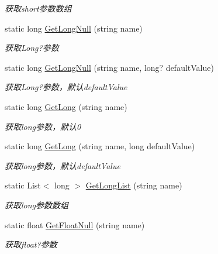 \begin{DoxyCompactItemize}
\begin{DoxyCompactList}\small\item\em 获取short参数数组 \end{DoxyCompactList}\item 
static long \hyperlink{class_x_c_l_net_tools_1_1_string_hander_1_1_form_helper_abffef0560d4655c00c5bdd3e4ff087cc}{Get\+Long\+Null} (string name)
\begin{DoxyCompactList}\small\item\em 获取\+Long?参数 \end{DoxyCompactList}\item 
static long \hyperlink{class_x_c_l_net_tools_1_1_string_hander_1_1_form_helper_a68e18e28dc369539e7efca42fc887041}{Get\+Long\+Null} (string name, long? default\+Value)
\begin{DoxyCompactList}\small\item\em 获取\+Long?参数，默认default\+Value \end{DoxyCompactList}\item 
static long \hyperlink{class_x_c_l_net_tools_1_1_string_hander_1_1_form_helper_a55353bd867fa827c8eb55a710df02cb1}{Get\+Long} (string name)
\begin{DoxyCompactList}\small\item\em 获取long参数，默认0 \end{DoxyCompactList}\item 
static long \hyperlink{class_x_c_l_net_tools_1_1_string_hander_1_1_form_helper_a51392713a245c7460bb5c823eb664ef8}{Get\+Long} (string name, long default\+Value)
\begin{DoxyCompactList}\small\item\em 获取long参数，默认default\+Value \end{DoxyCompactList}\item 
static List$<$ long $>$ \hyperlink{class_x_c_l_net_tools_1_1_string_hander_1_1_form_helper_ac00bef1db952ab0901c1813bbe193fa0}{Get\+Long\+List} (string name)
\begin{DoxyCompactList}\small\item\em 获取long参数数组 \end{DoxyCompactList}\item 
static float \hyperlink{class_x_c_l_net_tools_1_1_string_hander_1_1_form_helper_a6d0d3c455a9582ca4a4fa5bf4269deff}{Get\+Float\+Null} (string name)
\begin{DoxyCompactList}\small\item\em 获取float?参数 \end{DoxyCompactList}\item 

\end{DoxyCompactItemize}
